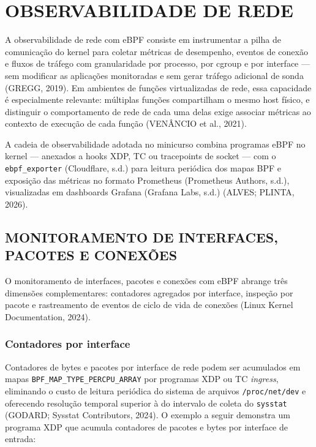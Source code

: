 \chapter{OBSERVABILIDADE DE REDE}
\label{cap:obs-rede}

A observabilidade de rede com eBPF consiste em instrumentar a pilha de comunicação
do kernel para coletar métricas de desempenho, eventos de conexão e fluxos de tráfego
com granularidade por processo, por cgroup e por interface — sem modificar as aplicações
monitoradas e sem gerar tráfego adicional de sonda (GREGG, 2019). Em ambientes de
funções virtualizadas de rede, essa capacidade é especialmente relevante: múltiplas
funções compartilham o mesmo host físico, e distinguir o comportamento de rede de cada
uma delas exige associar métricas ao contexto de execução de cada função (VENÂNCIO
et al., 2021).

A cadeia de observabilidade adotada no minicurso combina programas eBPF no kernel
— anexados a hooks XDP, TC ou tracepoints de socket — com o \texttt{ebpf\_exporter}
(Cloudflare, s.d.) para leitura periódica dos mapas BPF e exposição das métricas no
formato Prometheus (Prometheus Authors, s.d.), visualizadas em dashboards Grafana
(Grafana Labs, s.d.) (ALVES; PLINTA, 2026).

\section{MONITORAMENTO DE INTERFACES, PACOTES E CONEXÕES}

O monitoramento de interfaces, pacotes e conexões com eBPF abrange três dimensões
complementares: contadores agregados por interface, inspeção por pacote e rastreamento
de eventos de ciclo de vida de conexões (Linux Kernel Documentation, 2024).

\subsection*{Contadores por interface}

Contadores de bytes e pacotes por interface de rede podem ser acumulados em mapas
\texttt{BPF\_MAP\_TYPE\_PERCPU\_ARRAY} por programas XDP ou TC \textit{ingress},
eliminando o custo de leitura periódica do sistema de arquivos \texttt{/proc/net/dev}
e oferecendo resolução temporal superior à do intervalo de coleta do \texttt{sysstat}
(GODARD; Sysstat Contributors, 2024). O exemplo a seguir demonstra um programa XDP
que acumula contadores de pacotes e bytes por interface de entrada:

